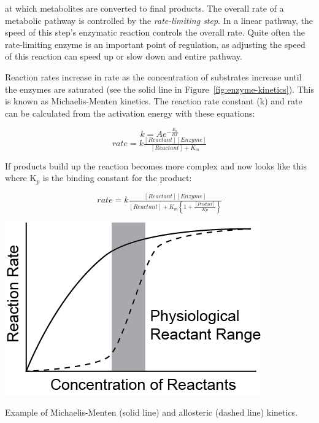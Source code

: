 \documentclass{tufte-handout}
\begin{document}
 at which metabolites are converted to final products. The overall rate of a metabolic pathway is controlled by the \emph{rate-limiting step}.  In a linear pathway, the speed of this step's enzymatic reaction controls the overall rate.  Quite often the rate-limiting enzyme is an important point of regulation, as adjusting the speed of this reaction can speed up or slow down and entire pathway.  

Reaction rates increase in rate as the concentration of substrates increase until the enzymes are saturated (see the solid line in Figure~\ref{fig:enzyme-kinetics}).  This is known as Michaelis-Menten kinetics.  The reaction rate constant (k) and rate can be calculated from the activation energy with these equations:

\begin{equation}
k = A e^{-\frac{E_{a}}{RT}} 
\end{equation}
\begin{equation}
rate = k\tfrac{[Reactant][Enzyme]}{[Reactant] + K_{m}}
\end{equation}

If products build up the reaction becomes more complex and now looks like this where K$_{p}$ is the binding constant for the product:

\begin{equation}
rate = k\tfrac{[Reactant][Enzyme]}{[Reactant] +K_{m}\left \{ 1 + \frac{[Product]}{Kp} \right \}}
\end{equation}

\begin{marginfigure}
\includegraphics[width=\marginparwidth]{figures/enzyme-kinetics.png}\
\caption{Example of Michaelis-Menten (solid line) and allosteric (dashed line) kinetics.}\label{fig:enzyme-kinetics}
\end{marginfigure}
\end{document}
